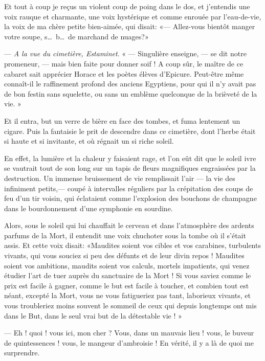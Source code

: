 Et tout à coup je reçus un violent coup de poing dans le dos, et
j’entendis une voix rauque et charmante, une voix
hystérique et comme enrouée par l’eau{}-de{}-vie, la
voix de ma chère petite bien{}-aimée, qui disait: «--- Allez{}-vous
bientôt manger votre soupe, s\ldots\ b\ldots\ de marchand de nuages?»


--- \textit{A la vue du cimetière, Estaminet}. « --- Singulière enseigne, --- se dit
notre promeneur, --- mais bien faite pour donner soif ! A coup sûr, le
maître de ce cabaret sait apprécier Horace et les poètes élèves
d’Epicure. Peut{}-être même connaît{}-il le
raffinement profond des anciens Egyptiens, pour qui il
n’y avait pas de bon festin sans squelette, ou sans un
emblème quelconque de la brièveté de la vie. »

Et il entra, but un verre de bière en face des tombes, et fuma lentement
un cigare. Puis la fantaisie le prit de descendre dans ce cimetière,
dont l’herbe était si haute et si invitante, et où
régnait un si riche soleil.

En effet, la lumière et la chaleur y faisaient rage, et
l’on eût dit que le soleil ivre se vautrait tout de
son long sur un tapis de fleurs magnifiques engraissées par la
destruction. Un immense bruissement de vie remplissait
l’air --- la vie des infiniment petits,--- coupé à
intervalles réguliers par la crépitation des coups de feu
d’un tir voisin, qui éclataient comme
l’explosion des bouchons de champagne dans le
bourdonnement d’une symphonie en sourdine.

Alors, sous le soleil qui lui chauffait le cerveau et dans
l’atmosphère des ardents parfums de la Mort, il
entendit une voix chuchoter sous la tombe où il
s’était assis. Et cette voix disait: «Maudites soient
vos cibles et vos carabines, turbulents vivants, qui vous souciez si
peu des défunts et de leur divin repos ! Maudites soient vos ambitions,
maudits soient vos calculs, mortels impatients, qui venez étudier
l’art de tuer auprès du sanctuaire de la Mort ! Si
vous saviez comme le prix est facile à gagner, comme le but est facile
à toucher, et combien tout est néant, excepté la Mort, vous ne vous
fatigueriez pas tant, laborieux vivants, et vous troubleriez moins
souvent le sommeil de ceux qui depuis longtemps ont mis dans le But,
dans le seul vrai but de la détestable vie ! »

--- Eh ! quoi ! vous ici, mon cher ? Vous, dans un mauvais lieu ! vous, le
buveur de quintessences ! vous, le mangeur d’ambroisie
! En vérité, il y a là de quoi me surprendre.

